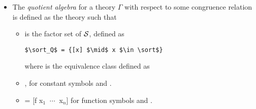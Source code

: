 \begin{itemize}
    \item The \emph{quotient algebra} for a theory $\Gamma$ with respect to some congruence relation \lstmath{$\equiv$} is defined as the theory  such that 
    \begin{itemize}
       \item {} is the factor set of $\mathcal{S}$, defined as 
       	\begin{lstlisting}[mathescape]
       	$\sort_Q$ = {[x] $\mid$ x $\in \sort$}
       	\end{lstlisting} 
       	where \lstmath{[x]} is the equivalence class defined as 
       \item {}, for constant symbols  and .  
       \item {} = [f x$_1$ $\ \cdots\ $ x$_n$]
       for function symbols  and .
    \end{itemize}      


\end{itemize}
